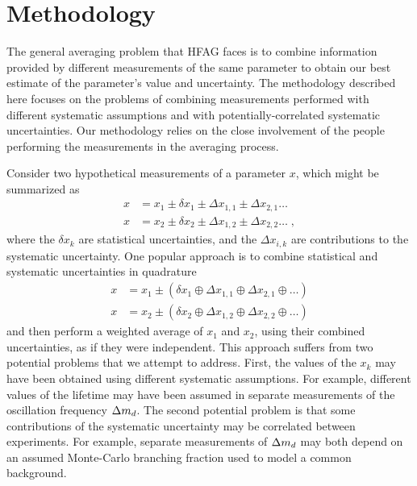 \section{Methodology } 
\label{sec:method} 

The general averaging problem that HFAG faces is to combine 
information provided by different measurements of the same parameter
to obtain our best estimate of the parameter's value and
uncertainty. The methodology described here focuses on the problems of
combining measurements performed with different systematic assumptions
and with potentially-correlated systematic uncertainties. Our methodology
relies on the close involvement of the people performing the
measurements in the averaging process.

Consider two hypothetical measurements of a parameter $x$, which might
be summarized as
\begin{align*}
x &= x_1 \pm \delta x_1 \pm \Delta x_{1,1} \pm \Delta x_{2,1} \ldots \\
x &= x_2 \pm \delta x_2 \pm \Delta x_{1,2} \pm \Delta x_{2,2} \ldots
\; ,
\end{align*}
where the $\delta x_k$ are statistical uncertainties, and
the $\Delta x_{i,k}$ are contributions to the systematic
uncertainty. One popular approach is to combine statistical and
systematic uncertainties in quadrature
\begin{align*}
x &= x_1 \pm \left(\delta x_1 \oplus \Delta x_{1,1} \oplus \Delta
x_{2,1} \oplus \ldots\right) \\
x &= x_2 \pm \left(\delta x_2 \oplus \Delta x_{1,2} \oplus \Delta
x_{2,2} \oplus \ldots\right)
\end{align*}
and then perform a weighted average of $x_1$ and $x_2$, using their
combined uncertainties, as if they were independent. This approach
suffers from two potential problems that we attempt to address. First,
the values of the $x_k$ may have been obtained using different
systematic assumptions. For example, different values of the \Bz
lifetime may have been assumed in separate measurements of the
oscillation frequency ${\rm \Delta}m_d$. The second potential problem is that
some contributions of the systematic uncertainty may be correlated
between experiments. For example, separate measurements of ${\rm \Delta}m_d$
may both depend on an assumed Monte-Carlo branching fraction used to
model a common background.

